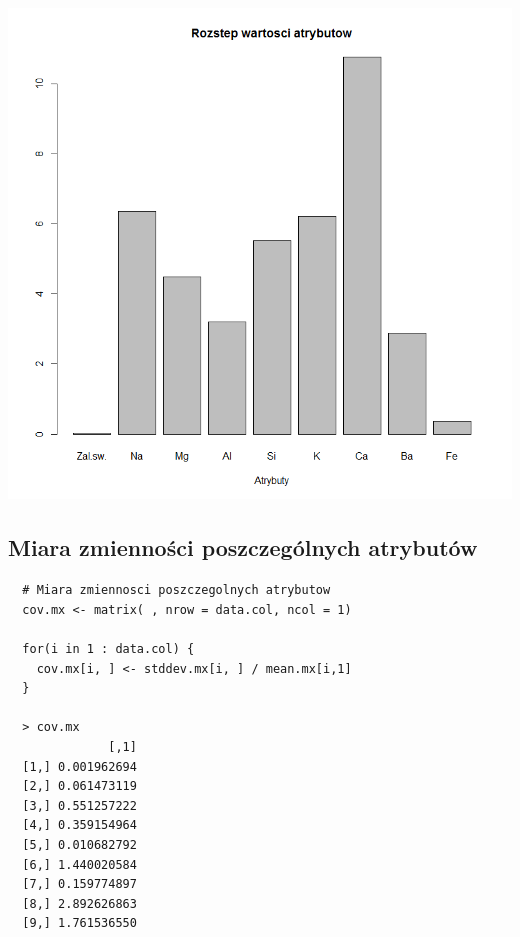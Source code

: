 \documentclass[a4paper,12pt,twoside]{article}
\begin{document}
\begin{center}
\includegraphics[width=.90\textwidth]{img/1_rozstep_wartosci.png}
\end{center}

\subsection{Miara zmienności poszczególnych atrybutów}

\begin{lstlisting}
  # Miara zmiennosci poszczegolnych atrybutow
  cov.mx <- matrix( , nrow = data.col, ncol = 1)

  for(i in 1 : data.col) {
    cov.mx[i, ] <- stddev.mx[i, ] / mean.mx[i,1]
  }

  > cov.mx
              [,1]
  [1,] 0.001962694
  [2,] 0.061473119
  [3,] 0.551257222
  [4,] 0.359154964
  [5,] 0.010682792
  [6,] 1.440020584
  [7,] 0.159774897
  [8,] 2.892626863
  [9,] 1.761536550
\end{lstlisting}
\end{document}
